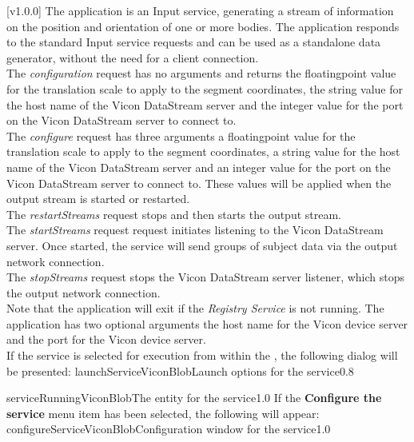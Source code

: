 [v1.0.0]
The  application is an Input service,
generating a stream of information on the position and orientation of one or more bodies.
The application responds to the standard Input service requests and can be used as a
standalone data generator, without the need for a client connection.\\

The \emph{configuration} request has no arguments and returns the floating\longDash{}point
value for the translation scale to apply to the segment coordinates, the string value for
the host name of the Vicon DataStream server and the integer value for the port on the
Vicon DataStream server to connect to.\\

The \emph{configure} request has three arguments \longDash{} a floating\longDash{}point
value for the translation scale to apply to the segment coordinates, a string value for
the host name of the Vicon DataStream server and an integer value for the port on the
Vicon DataStream server to connect to.
These values will be applied when the output stream is started or restarted.\\ 

The \emph{restartStreams} request stops and then starts the output stream.\\

The \emph{startStreams} request request initiates listening to the Vicon DataStream
server.
Once started, the service will send groups of subject data via the output \yarp{} network
connection.\\

The \emph{stopStreams} request stops the Vicon DataStream server listener, which stops the
output \yarp{} network connection.\\ 

Note that the application will exit if the \emph{Registry Service} is not running.
The application has two optional arguments \longDash{} the host name for the Vicon device
server and the port for the Vicon device server.
\insertAppParameters
\insertTagDescription{\VDSI}
\insertInputServiceComment\\

\insertStandardServiceCommands
\secondaryEnd
\condPage
{}
If the service is selected for execution from within the \emph{\MMMU}, the following
dialog will be presented:
%
{launchServiceViconBlob}{Launch options for the \VBI{} service}{0.8}

%
{serviceRunningViconBlob}{The \emph{\MMMU} entity for the \VBI{} service}{1.0}
\condPage{}
If the \textbf{Configure the service} menu item has been selected, the following will
appear:
%
{configureServiceViconBlob}{Configuration window for the \emph{\VBI} service}{1.0}
\secondaryEnd
\primaryEnd{}
